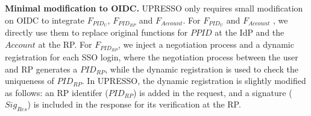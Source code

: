 \vspace{1mm}\noindent \textbf{Minimal modification to OIDC.}
UPRESSO only requires small modification on OIDC to integrate $F_{PID_U}$, $F_{PID_{RP}}$ and $F_{Account}$.
For $F_{PID_U}$ and $F_{Account}$ , we directly use them to replace original functions for $PPID$ at the IdP and the $Account$ at the RP.
For $F_{PID_{RP}}$, we inject a negotiation process and a dynamic registration for each SSO login,
 where the negotiation process between the user and RP generates a $PID_{RP}$,
  while the dynamic registration is used to check the uniqueness of $PID_{RP}$.
In UPRESSO, the dynamic registration is slightly modified as follows: an RP identifer ($PID_{RP}$)  is added in the request, and a signature ($Sig_{Res}$)  is included in the response for its verification at the RP.





